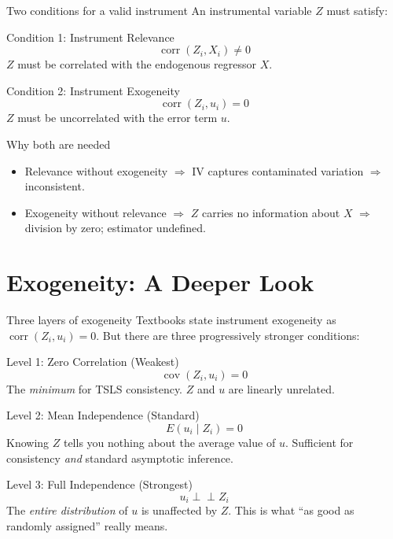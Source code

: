 \documentclass[10pt]{beamer}
\begin{document}
\begin{frame}{Two conditions for a valid instrument}
\label{slide:two_conditions}
An instrumental variable $Z$ must satisfy:

\begin{block}{Condition 1: Instrument Relevance}
\[
\operatorname{corr}(Z_i, X_i) \neq 0
\]
$Z$ must be correlated with the endogenous regressor $X$.
\end{block}

\begin{block}{Condition 2: Instrument Exogeneity}
\[
\operatorname{corr}(Z_i, u_i) = 0
\]
$Z$ must be uncorrelated with the error term $u$.
\end{block}

\pause
\begin{alertblock}{Why both are needed}
\begin{itemize}
  \item Relevance without exogeneity $\Rightarrow$ IV captures contaminated variation $\Rightarrow$ inconsistent.
  \item Exogeneity without relevance $\Rightarrow$ $Z$ carries no information about $X$ $\Rightarrow$ division by zero; estimator undefined.
\end{itemize}
\end{alertblock}
\end{frame}

\section{Exogeneity: A Deeper Look}

\begin{frame}{Three layers of exogeneity}
\label{slide:exogeneity_layers}
Textbooks state instrument exogeneity as $\operatorname{corr}(Z_i,u_i)=0$. But there are three progressively stronger conditions:

\begin{block}{Level 1: Zero Correlation (Weakest)}
\[
\operatorname{cov}(Z_i, u_i) = 0
\]
The \emph{minimum} for TSLS consistency. $Z$ and $u$ are linearly unrelated.
\end{block}

\pause
\begin{block}{Level 2: Mean Independence (Standard)}
\[
E(u_i \mid Z_i) = 0
\]
Knowing $Z$ tells you \alert{nothing} about the average value of $u$. Sufficient for consistency \emph{and} standard asymptotic inference.
\end{block}

\pause
\begin{block}{Level 3: Full Independence (Strongest)}
\[
u_i \perp\!\!\!\perp Z_i
\]
The \emph{entire distribution} of $u$ is unaffected by $Z$. This is what ``as good as randomly assigned'' really means.
\end{block}
\end{frame}
\end{document}
